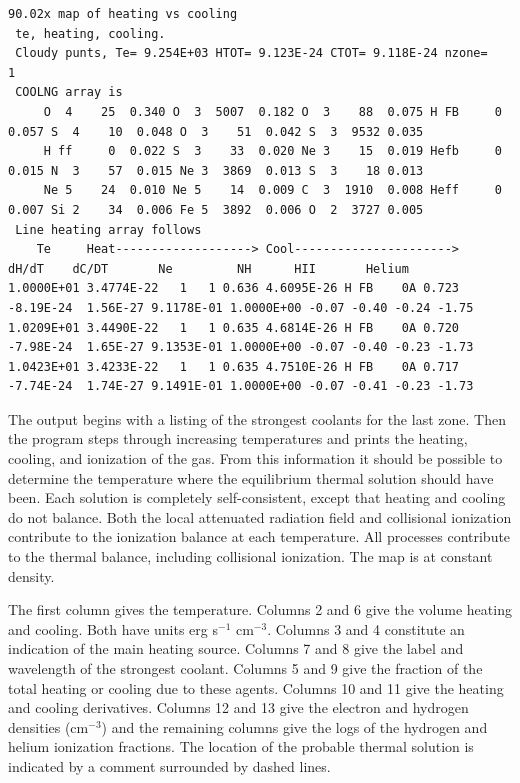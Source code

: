 \tiny
\begin{verbatim}
90.02x map of heating vs cooling
 te, heating, cooling.
 Cloudy punts, Te= 9.254E+03 HTOT= 9.123E-24 CTOT= 9.118E-24 nzone=   1
 COOLNG array is
     O  4    25  0.340 O  3  5007  0.182 O  3    88  0.075 H FB     0  0.057 S  4    10  0.048 O  3    51  0.042 S  3  9532 0.035
     H ff     0  0.022 S  3    33  0.020 Ne 3    15  0.019 Hefb     0  0.015 N  3    57  0.015 Ne 3  3869  0.013 S  3    18 0.013
     Ne 5    24  0.010 Ne 5    14  0.009 C  3  1910  0.008 Heff     0  0.007 Si 2    34  0.006 Fe 5  3892  0.006 O  2  3727 0.005
 Line heating array follows
    Te     Heat-------------------> Cool---------------------->    dH/dT    dC/DT       Ne         NH      HII       Helium
1.0000E+01 3.4774E-22   1   1 0.636 4.6095E-26 H FB    0A 0.723 -8.19E-24  1.56E-27 9.1178E-01 1.0000E+00 -0.07 -0.40 -0.24 -1.75
1.0209E+01 3.4490E-22   1   1 0.635 4.6814E-26 H FB    0A 0.720 -7.98E-24  1.65E-27 9.1353E-01 1.0000E+00 -0.07 -0.40 -0.23 -1.73
1.0423E+01 3.4233E-22   1   1 0.635 4.7510E-26 H FB    0A 0.717 -7.74E-24  1.74E-27 9.1491E-01 1.0000E+00 -0.07 -0.41 -0.23 -1.73
\end{verbatim}
\normalsize

The output begins with a listing of the strongest coolants for the last
zone.
Then the program steps through increasing temperatures and prints
the heating, cooling, and ionization of the gas.
From this information
it should be possible to determine the temperature where the equilibrium
thermal solution should have been.
Each solution is completely
self-consistent, except that heating and cooling do not balance.
Both the
local attenuated radiation field and collisional ionization contribute to
the ionization balance at each temperature.
All processes contribute to
the thermal balance, including collisional ionization.
The map is at
constant density.

The first column gives the temperature.
Columns 2 and 6 give the volume
heating and cooling.
Both have units erg s$^{-1}$ cm$^{-3}$.
Columns 3 and 4
constitute an indication of the main heating source.
Columns 7 and 8 give
the label and wavelength of the strongest coolant.
Columns 5 and 9 give
the fraction of the total heating or cooling due to these agents.
Columns
10 and 11 give the heating and cooling derivatives.
Columns 12 and 13 give
the electron and hydrogen densities (cm$^{-3}$) and the remaining columns give
the logs of the hydrogen and helium ionization fractions.
The location
of the probable thermal solution is indicated by a comment surrounded by
dashed lines.

